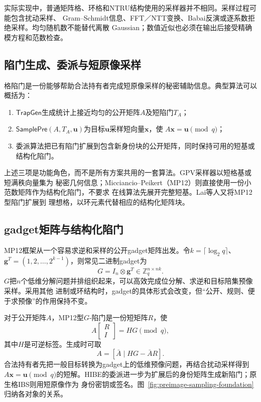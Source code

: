 实际实现中，普通矩阵格、环格和NTRU结构使用的采样器并不相同。采样过程可能包含扰动采样、
Gram--Schmidt信息、FFT／NTT变换、Babai反演或逐系数拒绝采样。均匀随机数不能替代离散
Gaussian；数值近似也必须在输出后接受精确模方程和范数检查。

\subsection{陷门生成、委派与短原像采样}

格陷门是一份能够帮助合法持有者完成短原像采样的秘密辅助信息。典型算法可以概括为：

\begin{enumerate}
  \item $\mathsf{TrapGen}$生成统计上接近均匀的公开矩阵$A$及短陷门$T_A$；
  \item $\mathsf{SamplePre}(A,T_A,\mathbf u)$为目标$\mathbf u$采样短向量$\mathbf x$，使
        $A\mathbf x=\mathbf u\pmod q$；
  \item 委派算法把已有陷门扩展到包含新身份块的公开矩阵，同时保持可用的短基或结构化陷门。
\end{enumerate}

上述三项是功能角色，而不是所有方案共用的一套算法。GPV采样器以短格基或短满秩向量集为
秘密几何信息；Micciancio--Peikert（MP12）则直接使用一份小范数矩阵作为结构化陷门，不要求
在线算法先展开完整短基\cite{gpv2008,micciancio2012trapdoors}。Lai等人又将MP12型陷门扩展到
理想格，以环元素代替相应的结构化矩阵块\cite{lai2015trapdoors}。

\subsection{gadget矩阵与结构化陷门}

MP12框架从一个容易求逆和采样的公开gadget矩阵出发。令$k=\lceil\log_2q\rceil$、
$\mathbf g^T=(1,2,\ldots,2^{k-1})$，则常见二进制gadget为
\[
 G=I_n\otimes\mathbf g^T\in\mathbb Z_q^{n\times nk}.
\]
$G$把$n$个低维分解问题并排组织起来，可以高效完成位分解、求逆和目标陪集预像采样。采用其他
进制或环结构时，gadget的具体形式会改变，但“公开、规则、便于求预像”的作用保持不变。

对于公开矩阵$A$，MP12型$G$-陷门是一份短矩阵$R$，使
\[
 A\begin{bmatrix}R\\I\end{bmatrix}=HG\pmod q,
\]
其中$H$是可逆标签。生成时可取
\[
 A=[\bar A\mid HG-\bar A R].
\]
合法持有者先把一般目标转换为gadget上的低维预像问题，再结合扰动采样得到$A\mathbf x=\mathbf u
\pmod q$的短解。HIBE的委派进一步为扩展后的身份矩阵生成新陷门；原生格IBS则用短原像作为
身份密钥或签名。图~\ref{fig:preimage-sampling-foundation}归纳各对象的关系。

